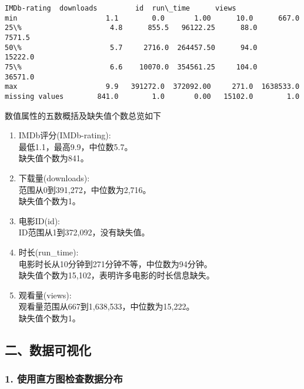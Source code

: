 \documentclass[11pt]{article}
\makeatletter
\newcommand{\boxspacing}{\kern\kvtcb@left@rule\kern\kvtcb@boxsep}
\newcommand{\prompt}[4]{
        {\ttfamily\llap{{\color{#2}[#3]:\hspace{3pt}#4}}\vspace{-\baselineskip}}
    }
\makeatother
\begin{document}
            \begin{tcolorbox}[breakable, size=fbox, boxrule=.5pt, pad at break*=1mm, opacityfill=0]
\prompt{Out}{outcolor}{20}{\boxspacing}
\begin{Verbatim}[commandchars=\\\{\}]
                IMDb-rating  downloads         id  run\_time      views
min                     1.1        0.0       1.00      10.0      667.0
25\%                     4.8      855.5   96122.25      88.0     7571.5
50\%                     5.7     2716.0  264457.50      94.0    15222.0
75\%                     6.6    10070.0  354561.25     104.0    36571.0
max                     9.9   391272.0  372092.00     271.0  1638533.0
missing values        841.0        1.0       0.00   15102.0        1.0
\end{Verbatim}
\end{tcolorbox}
        
    数值属性的五数概括及缺失值个数总览如下

\begin{enumerate}
\def\labelenumi{\arabic{enumi}.}
\item
  IMDb评分(IMDb-rating):\\
  最低1.1，最高9.9，中位数5.7。\\
  缺失值个数为841。
\item
  下载量(downloads):\\
  范围从0到391,272，中位数为2,716。\\
  缺失值个数为1。
\item
  电影ID(id):\\
  ID范围从1到372,092，没有缺失值。
\item
  时长(run\_time):\\
  电影时长从10分钟到271分钟不等，中位数为94分钟。\\
  缺失值个数为15,102，表明许多电影的时长信息缺失。
\item
  观看量(views):\\
  观看量范围从667到1,638,533，中位数为15,222。\\
  缺失值个数为1。
\end{enumerate}

    \subsection{二、数据可视化}\label{ux4e8cux6570ux636eux53efux89c6ux5316}

    \subsubsection{1.
使用直方图检查数据分布}\label{ux4f7fux7528ux76f4ux65b9ux56feux68c0ux67e5ux6570ux636eux5206ux5e03}
\end{document}
